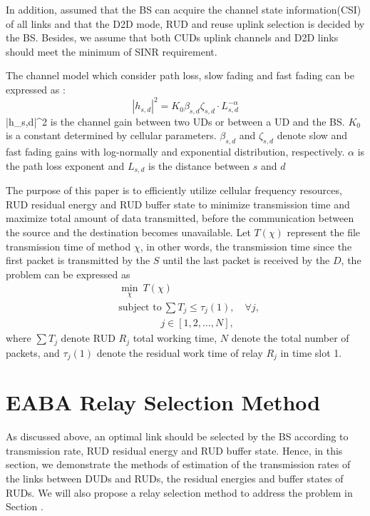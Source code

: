 \documentclass[conference]{IEEEtran}
\begin{document}
In addition, assumed that the BS can acquire the channel state information(CSI) of all links and that the D2D mode, RUD and reuse uplink selection is decided by the BS. Besides, we assume that both CUDs uplink channels and D2D links should meet the minimum of SINR requirement.

The channel model which consider path loss, slow fading and fast fading can be expressed as \cite{6560489}:
\begin{equation}
|{h_{s,d}}|^{2} = K_{0}\beta_{s,d}\zeta_{s,d}\cdot L_{s,d}^{-\alpha}
\end{equation}
|{h_{s,d}}|^{2} is the channel gain between two UDs or between a UD and the BS. $K_{0}$ is a constant determined by cellular parameters. $\beta_{s,d}$ and $\zeta_{s,d}$ denote slow and fast fading gains with log-normally and exponential distribution, respectively. $\alpha$ is the path loss exponent and $L_{s,d}$ is the distance between $s$ and $d$

The purpose of this paper is to efficiently utilize cellular frequency resources, RUD residual energy and RUD buffer state to minimize transmission time and maximize total amount of data transmitted, before the communication between the source and the destination  becomes unavailable. Let $T\left(\chi\right)$ represent the file transmission time of method $\chi$, in other words, the transmission time since the first packet is transmitted by the $S$ until the last packet is received by the $D$, the problem can be expressed as
\begin{align}
&\displaystyle \min _{\mathcal {\chi}} ~T(\mathcal {\chi})
\\[-5pt]&\text {subject to} ~ \sum T_{j} \leq \tau_j(1) , \quad \forall j , \tag{2a}
\\[-1.5pt]&\qquad \qquad ~ j\in\left[1,2,\ldots,N\right] , \tag{2b}
\end{align}
where $\sum T_{j}$ denote RUD $R_{j}$ total working time, $N$ denote the total number of packets, and $ \tau_j(1)$ denote the residual work time of relay $R_j$ in time slot 1.

\section{EABA Relay Selection Method}
As discussed above, an optimal link should be selected by the BS according to transmission rate, RUD residual energy and RUD buffer state. Hence, in this section, we demonstrate the methods of estimation of the transmission rates of the links between DUDs and RUDs, the residual energies and buffer states of RUDs. We will also propose a relay selection method to address the problem in Section \uppercase\expandafter{}.
\end{document}
